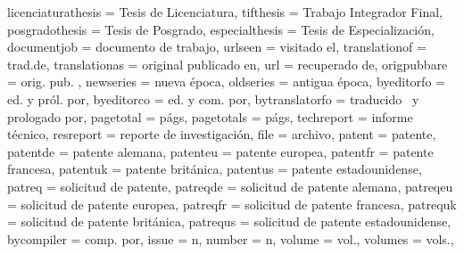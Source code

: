 {	licenciaturathesis = {Tesis de Licenciatura},
	tifthesis        = {Trabajo Integrador Final},
	posgradothesis   = {Tesis de Posgrado},
	especialthesis   = {Tesis de Especialización},
	documentjob      = {documento de trabajo},
	urlseen          = {visitado el\addspace},
	translationof    = {trad\adddot\addspace de},
	translationas    = {original publicado en},
	url              = {recuperado de},
	origpubbare      = {orig\adddotspace pub\adddotspace},
	newseries        = {nueva época},
	oldseries        = {antigua época},
	byeditorfo       = {ed\adddotspace y pról\adddotspace por},
	byeditorco       = {ed\adddotspace y com\adddotspace por},
	bytranslatorfo   = {traducido \lbx@lfromlang\ y prologado por},
	pagetotal        = {págs},
	pagetotals       = {págs},
	techreport       = {informe técnico},
	resreport        = {reporte de investigación},
	file             = {archivo},
	patent           = {patente},
	patentde         = {patente alemana},
	patenteu         = {patente europea},
	patentfr         = {patente francesa},
	patentuk         = {patente británica},
	patentus         = {patente estadounidense},
	patreq           = {solicitud de patente},
	patreqde         = {solicitud de patente alemana},
	patreqeu         = {solicitud de patente europea},
	patreqfr         = {solicitud de patente francesa},
	patrequk         = {solicitud de patente británica},
	patrequs         = {solicitud de patente estadounidense},
	bycompiler       = {comp\adddotspace por},
	issue            = {n},
	number           = {n},
	volume           = {vol\adddot},
	volumes          = {vols\adddot},
}

\makeatletter
{}
\makeatother
